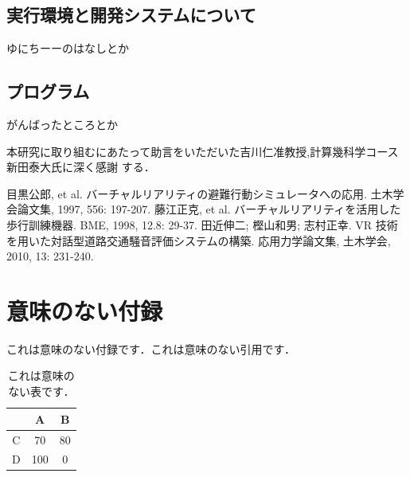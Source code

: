 \documentclass[dvipdfmx]{ampbt}
\def\numberofspines{1}
\begin{document}
\subsection{実行環境と開発システムについて}
ゆにちーーのはなしとか
\subsection{プログラム}
がんばったところとか




\clearpage
\acknowledgment
本研究に取り組むにあたって助言をいただいた吉川仁准教授,計算幾科学コース新田泰大氏に深く感謝
する．

\begin{thebibliography}{10}
目黒公郎, et al. バーチャルリアリティの避難行動シミュレータへの応用. 土木学会論文集, 1997, 556: 197-207.
藤江正克, et al. バーチャルリアリティを活用した歩行訓練機器. BME, 1998, 12.8: 29-37.
田近伸二; 樫山和男; 志村正幸. VR 技術を用いた対話型道路交通騒音評価システムの構築. 応用力学論文集, 土木学会, 2010, 13: 231-240.
\end{thebibliography}

\appendix

\section{意味のない付録}
これは意味のない付録です．これは意味のない引用です\cite{polya1945}．

\begin{table}[htbp]
  \caption{これは意味のない表です．}
  \centering
  \begin{tabular}{c|cc}
      &  A  &  B \\
    \hline
    C &  70 & 80 \\
    D & 100 &  0
  \end{tabular}
\end{table}

\fi
\ifoutputcover
\cleardoublepage
\makecover                      %
\makespine[\numberofspines]     %
\fi
\ifoutputabstractforsubmission
\makeabstractforsubmission      %
\fi
\end{document}

